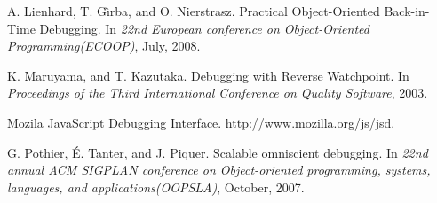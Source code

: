 \documentclass[runningheads,a4paper]{llncs}
\begin{document}
\begin{thebibliography}{16}
A. Lienhard, T. G\^{\i}rba, and O. Nierstrasz. \newblock Practical Object-Oriented Back-in-Time Debugging.
\newblock In \emph{22nd European conference on Object-Oriented Programming(ECOOP)},
July, 2008.

K. Maruyama, and T. Kazutaka. \newblock Debugging with Reverse Watchpoint.
\newblock In \emph{Proceedings of the Third International Conference on Quality Software},
2003.

Mozila JavaScript Debugging Interface. \newblock http://www.mozilla.org/js/jsd.

G. Pothier, \'{E}. Tanter, and J. Piquer. \newblock Scalable omniscient debugging.
\newblock In \emph{22nd annual ACM SIGPLAN conference on Object-oriented programming, systems, languages, and applications(OOPSLA)},
October, 2007.


\end{thebibliography}
\end{document}
